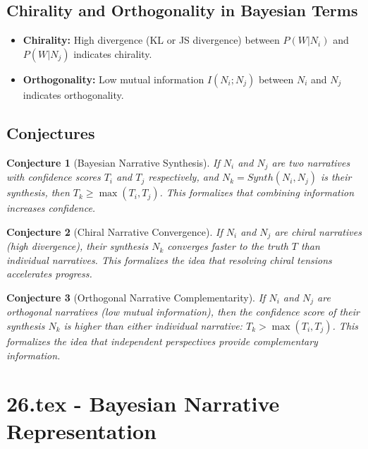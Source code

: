 \documentclass[12pt, a4paper]{article}
\newtheorem{conjecture}{Conjecture}
\begin{document}
\subsection{Chirality and Orthogonality in Bayesian Terms}

\begin{itemize}
    \item \textbf{Chirality:}  High divergence (KL or JS divergence) between $P(W|N_i)$ and $P(W|N_j)$ indicates chirality.
    \item \textbf{Orthogonality:} Low mutual information $I(N_i; N_j)$ between $N_i$ and $N_j$ indicates orthogonality.
\end{itemize}

\subsection{Conjectures}

\begin{conjecture}[Bayesian Narrative Synthesis]
If $N_i$ and $N_j$ are two narratives with confidence scores $T_i$ and $T_j$ respectively, and $N_k = Synth(N_i, N_j)$ is their synthesis, then $T_k \ge \max(T_i, T_j)$. This formalizes that combining information increases confidence.
\end{conjecture}

\begin{conjecture}[Chiral Narrative Convergence]
If $N_i$ and $N_j$ are chiral narratives (high divergence), their synthesis $N_k$ converges faster to the truth $T$ than individual narratives. This formalizes the idea that resolving chiral tensions accelerates progress.
\end{conjecture}

\begin{conjecture}[Orthogonal Narrative Complementarity]
If $N_i$ and $N_j$ are orthogonal narratives (low mutual information), then the confidence score of their synthesis $N_k$ is higher than either individual narrative: $T_k > \max(T_i, T_j)$. This formalizes the idea that independent perspectives provide complementary information.
\end{conjecture}






\section{26.tex - Bayesian Narrative Representation}
\end{document}
